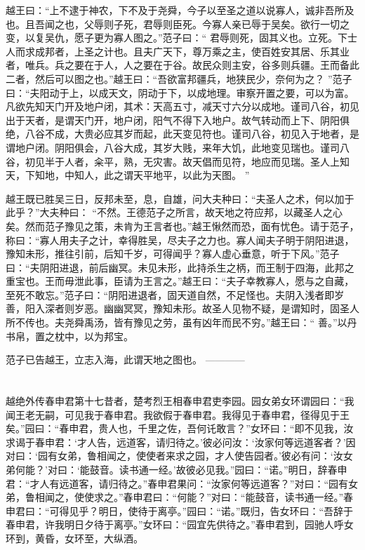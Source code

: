\documentclass[12pt,UTF8]{ctexbook}
\begin{document}
越王曰：“上不逮于神农，下不及于尧舜，今子以至圣之道以说寡人，诚非吾所及也。且吾闻之也，父辱则子死，君辱则臣死。今寡人亲已辱于吴矣。欲行一切之变，以复吴仇，愿子更为寡人图之。”范子曰：“ 君辱则死，固其义也。立死。下士人而求成邦者，上圣之计也。且夫广天下，尊万乘之主，使百姓安其居、乐其业者，唯兵。兵之要在于人，人之要在于谷。故民众则主安，谷多则兵疆。王而备此二者，然后可以图之也。”越王曰：“吾欲富邦疆兵，地狭民少，奈何为之？ ”范子曰：“夫阳动于上，以成天文，阴动于下，以成地理。审察开置之要，可以为富。凡欲先知天门开及地户闭，其术：天高五寸，减天寸六分以成地。谨司八谷，初见出于天者，是谓天门开，地户闭，阳气不得下入地户。故气转动而上下、阴阳俱绝，八谷不成，大贵必应其岁而起，此天变见符也。谨司八谷，初见入于地者，是谓地户闭。阴阳俱会，八谷大成，其岁大贱，来年大饥，此地变见瑞也。谨司八谷，初见半于人者，籴平，熟，无灾害。故天倡而见符，地应而见瑞。圣人上知天，下知地，中知人，此之谓天平地平，以此为天图。 ”

越王既已胜吴三日，反邦未至，息，自雄，问大夫种曰：“夫圣人之术，何以加于此乎？”大夫种曰： “不然。王德范子之所言，故天地之符应邦，以藏圣人之心矣。然而范子豫见之策，未肯为王言者也。”越王愀然而恐，面有忧色。请于范子，称曰：“寡人用夫子之计，幸得胜吴，尽夫子之力也。寡人闻夫子明于阴阳进退，豫知未形，推往引前，后知千岁，可得闻乎？寡人虚心垂意，听于下风。”范子曰：“夫阴阳进退，前后幽冥。未见未形，此持杀生之柄，而王制于四海，此邦之重宝也。王而毋泄此事，臣请为王言之。”越王曰：“夫子幸教寡人，愿与之自藏，至死不敢忘。”范子曰：“阴阳进退者，固天道自然，不足怪也。夫阴入浅者即岁善，阳入深者则岁恶。幽幽冥冥，豫知未形。故圣人见物不疑，是谓知时，固圣人所不传也。夫尧舜禹汤，皆有豫见之劳，虽有凶年而民不穷。”越王曰：“ 善。”以丹书帛，置之枕中，以为邦宝。

范子已告越王，立志入海，此谓天地之图也。
------------

\part{}

越绝外传春申君第十七昔者，楚考烈王相春申君吏李园。园女弟女环谓园曰：“我闻王老无嗣，可见我于春申君。我欲假于春申君。我得见于春申君，径得见于王矣。”园曰：“春申君，贵人也，千里之佐，吾何讬敢言？”女环曰：“即不见我，汝求谒于春申君：‘才人告，远道客，请归待之。’彼必问汝：‘汝家何等远道客者？’因对曰：‘园有女弟，鲁相闻之，使使者来求之园，才人使告园者。’彼必有问：‘汝女弟何能？’对曰：‘能鼓音。读书通一经。’故彼必见我。”园曰：“诺。”明日，辞春申君：“才人有远道客，请归待之。”春申君果问：“汝家何等远道客？”对曰：“园有女弟，鲁相闻之，使使求之。”春申君曰：“何能？”对曰：“能鼓音，读书通一经。”春申君曰：“可得见乎？明日，使待于离亭。”园曰：“诺。”既归，告女环曰：“吾辞于春申君，许我明日夕待于离亭。”女环曰：“园宜先供待之。”春申君到，园驰人呼女环到，黄昏，女环至，大纵酒。
\end{document}
